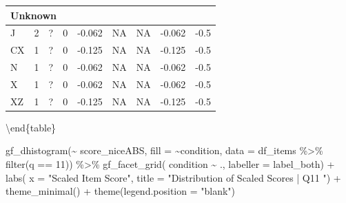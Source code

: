 \documentclass[
  letterpaper,
  DIV=11,
  numbers=noendperiod]{scrreprt}
\newenvironment{Shaded}{\begin{snugshade}}{\end{snugshade}}
\newcommand{\AttributeTok}[1]{\textcolor[rgb]{0.40,0.45,0.13}{#1}}
\newcommand{\DecValTok}[1]{\textcolor[rgb]{0.68,0.00,0.00}{#1}}
\newcommand{\FunctionTok}[1]{\textcolor[rgb]{0.28,0.35,0.67}{#1}}
\newcommand{\NormalTok}[1]{\textcolor[rgb]{0.00,0.23,0.31}{#1}}
\newcommand{\SpecialCharTok}[1]{\textcolor[rgb]{0.37,0.37,0.37}{#1}}
\newcommand{\StringTok}[1]{\textcolor[rgb]{0.13,0.47,0.30}{#1}}
\begin{document}
\begin{tabular}[t]{l|r|l|r|r|r|r|r|r}
\hline
\multicolumn{9}{l}{\textbf{Unknown}}\\
\hline
\hspace{1em}J & 2 & ? & 0 & -0.062 & NA & NA & -0.062 & -0.5\\
\hline
\hspace{1em}CX & 1 & ? & 0 & -0.125 & NA & NA & -0.125 & -0.5\\
\hline
\hspace{1em}N & 1 & ? & 0 & -0.062 & NA & NA & -0.062 & -0.5\\
\hline
\hspace{1em}X & 1 & ? & 0 & -0.062 & NA & NA & -0.062 & -0.5\\
\hline
\hspace{1em}XZ & 1 & ? & 0 & -0.125 & NA & NA & -0.125 & -0.5\\
\hline
\end{tabular}

\textbackslash end\{table\}

\begin{Shaded}
\begin{Highlighting}[]
\FunctionTok{gf\_dhistogram}\NormalTok{(}\SpecialCharTok{\textasciitilde{}}\NormalTok{ score\_niceABS, }\AttributeTok{fill =} \SpecialCharTok{\textasciitilde{}}\NormalTok{condition, }\AttributeTok{data =}\NormalTok{ df\_items }\SpecialCharTok{\%\textgreater{}\%} \FunctionTok{filter}\NormalTok{(q }\SpecialCharTok{==} \DecValTok{11}\NormalTok{)) }\SpecialCharTok{\%\textgreater{}\%} 
  \FunctionTok{gf\_facet\_grid}\NormalTok{( condition }\SpecialCharTok{\textasciitilde{}}\NormalTok{ ., }\AttributeTok{labeller =}\NormalTok{ label\_both) }\SpecialCharTok{+} 
  \FunctionTok{labs}\NormalTok{( }\AttributeTok{x =} \StringTok{"Scaled Item Score"}\NormalTok{, }\AttributeTok{title =} \StringTok{"Distribution of Scaled Scores | Q11 "}\NormalTok{) }\SpecialCharTok{+} 
  \FunctionTok{theme\_minimal}\NormalTok{() }\SpecialCharTok{+} \FunctionTok{theme}\NormalTok{(}\AttributeTok{legend.position =} \StringTok{"blank"}\NormalTok{)}
\end{Highlighting}
\end{Shaded}
\end{document}
